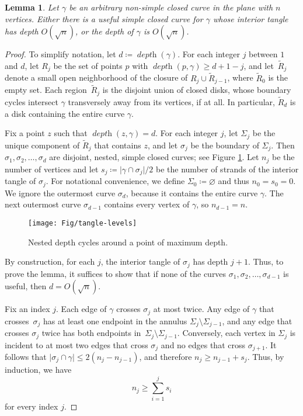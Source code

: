 \documentclass[11pt,twoside]{article}
\def\set#1{\{ #1 \}}
\def\abs#1{\mathopen| #1 \mathclose|}		%
\def\Depth{\operatorname{\mathit{depth}}}
\newtheorem{lemma}[theorem]{Lemma}
\numberwithin{figure}{section}
\begin{document}
\begin{lemma}
\label{L:useful}
Let $\gamma$ be an arbitrary non-simple closed curve in the plane with $n$ vertices.  Either there is a useful simple closed curve for $\gamma$ whose interior tangle has depth $O(\sqrt{n})$, or the depth of $\gamma$ is $O(\sqrt{n})$.
\end{lemma}

\begin{proof}
To simplify notation, let $d \coloneqq \Depth(\gamma)$. For each integer $j$ between $1$ and $d$, let $R_j$ be the set of points $p$ with $\Depth(p, \gamma) \ge d+1-j$, 
and let~$\tilde{R}_j$ denote a small open neighborhood of the closure of $R_j \cup \tilde{R}_{j-1}$, where $\tilde{R}_0$ is the empty set.  Each region~$\tilde{R}_j$ is the disjoint union of closed disks, whose boundary cycles intersect $\gamma$ transversely away from its vertices, if at all. In particular, $\tilde{R}_d$ is a disk containing the entire curve $\gamma$. 

Fix a point $z$ such that $\Depth(z,\gamma) = d$. For each integer $j$, let $\Sigma_j$ be the unique component of $\tilde{R}_j$ that contains $z$, and let $\sigma_j$ be the boundary of $\Sigma_j$. Then~$\sigma_1, \sigma_2, \dots, \sigma_d$ are disjoint, nested, simple closed curves; see Figure \ref{F:curve-levels}. Let $n_j$ be the number of vertices and let $s_j \coloneqq \abs{\gamma \cap \sigma_j}/2$ be the number of strands of the interior tangle of $\sigma_j$. For notational convenience, we define $\Sigma_0 \coloneqq \varnothing$ and thus $n_0 = s_0 = 0$.  We ignore the outermost curve $\sigma_d$, because it contains the entire curve $\gamma$.  The next outermost curve $\sigma_{d-1}$ contains every vertex of $\gamma$, so $n_{d-1} = n$.

\begin{figure}[ht]
\centering
\texttt{[image: Fig/tangle-levels]}
\caption{Nested depth cycles around a point of maximum depth.}
\label{F:curve-levels}
\end{figure}

By construction, for each $j$, the interior tangle of $\sigma_j$ has depth $j+1$.  Thus, to prove the lemma, it suffices to show that if none of the curves $\sigma_1, \sigma_2, \dots, \sigma_{d-1}$ is useful, then $d = O(\sqrt{n})$.

Fix an index $j$. Each edge of $\gamma$ crosses $\sigma_j$ at most twice. Any edge of $\gamma$ that crosses~$\sigma_j$ has at least one endpoint in the annulus $\Sigma_j \setminus \Sigma_{j-1}$, and any edge that crosses $\sigma_j$ twice has both endpoints in~$\Sigma_j \setminus \Sigma_{j-1}$. Conversely, each vertex in $\Sigma_j$ is incident to at most two edges that cross $\sigma_j$ and no edges that cross $\sigma_{j+1}$. It follows that $\abs{\sigma_j\cap\gamma} \le 2(n_j - n_{j-1})$, and therefore $n_j \geq n_{j-1} + s_j$. 
Thus, by induction, we have
\[
	n_j \ge \sum_{i=1}^j s_i
\]
for every index $j$. 


\end{proof}
\end{document}

